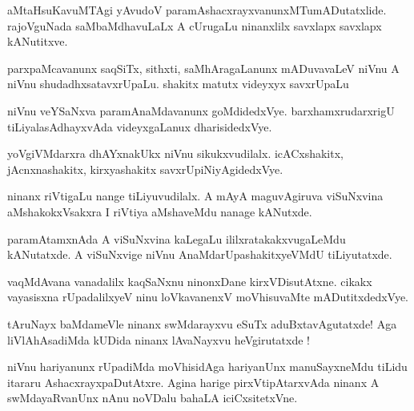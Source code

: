 \documentclass{article}
\begin{document}
\begin{mn}%
aMtaHsuKavuMTAgi yAvudoV paramAshacxrayxvanunxMTumADutatxlide. rajoVguNada saMbaMdhavuLaLx 
A cUrugaLu ninanxlilx savxlapx savxlapx kANutitxve. 
\end{mn}

\begin{mn}%
parxpaMcavanunx saqSiTx, sithxti, saMhAragaLanunx mADuvavaLeV niVnu  A niVnu 
shudadhxsatavxrUpaLu. shakitx matutx videyxyx savxrUpaLu
\end{mn}

\begin{mn}%
niVnu veYSaNxva paramAnaMdavanunx goMdidedxVye. barxhamxrudarxrigU tiLiyalasAdhayxvAda 
videyxgaLanux dharisidedxVye.
\end{mn}

\begin{mn}%
yoVgiVMdarxra dhAYxnakUkx niVnu sikukxvudilalx. icACxshakitx, jAcnxnashakitx, 
kirxyashakitx savxrUpiNiyAgidedxVye.
\end{mn}

\begin{mn}%
ninanx riVtigaLu nange tiLiyuvudilalx. A mAyA maguvAgiruva viSuNxvina aMshakokxVsakxra I 
riVtiya aMshaveMdu nanage kANutxde.
\end{mn}

\begin{mn}%
paramAtamxnAda A viSuNxvina kaLegaLu ililxratakakxvugaLeMdu kANutatxde. A viSuNxvige niVnu 
AnaMdarUpashakitxyeVMdU tiLiyutatxde.
\end{mn}

\begin{mn}%
vaqMdAvana vanadalilx kaqSaNxnu ninonxDane kirxVDisutAtxne. cikakx vayasisxna 
rUpadalilxyeV ninu loVkavanenxV moVhisuvaMte mADutitxdedxVye.
\end{mn}

\begin{mn}%
tAruNayx baMdameVle ninanx swMdarayxvu eSuTx aduBxtavAgutatxde! Aga liVlAhAsadiMda kUDida 
ninanx lAvaNayxvu heVgirutatxde !
\end{mn}

\begin{mn}%
niVnu hariyanunx rUpadiMda moVhisidAga hariyanUnx manuSayxneMdu tiLidu itararu 
AshacxrayxpaDutAtxre. Agina harige pirxVtipAtarxvAda ninanx A swMdayaRvanUnx nAnu noVDalu 
bahaLA iciCxsitetxVne.
\end{mn}
\end{document}
